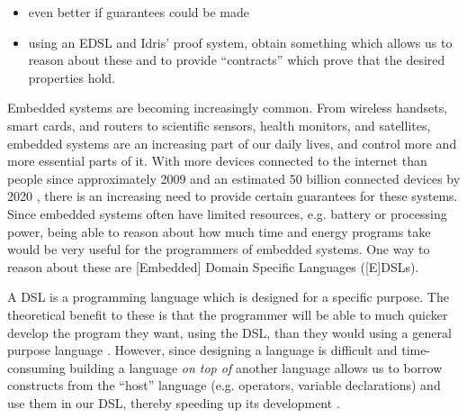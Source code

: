 \begin{itemize}
	\item even better if guarantees could be made
	\item using an EDSL and Idris' proof system, obtain something which allows
		  us to reason about these and to provide ``contracts'' which prove that
		  the desired properties hold.
\end{itemize}

Embedded systems are becoming increasingly common. From wireless handsets, smart cards, and routers to scientific sensors, health monitors, and satellites, embedded systems are an increasing part of our daily lives, and control more and more essential parts of it. With more devices connected to the internet than people since approximately 2009 and an estimated 50 billion connected devices by 2020 \cite{cisco-whitepaper}, there is an increasing need to provide certain guarantees for these systems. Since embedded systems often have limited resources, e.g. battery or processing power, being able to reason about how much time and energy programs take would be very useful for the programmers of embedded systems. One way to reason about these are [Embedded] Domain Specific Languages ([E]DSLs).\\\par

A DSL is a programming language which is designed for a specific purpose. The theoretical benefit to these is that the programmer will be able to much quicker develop the program they want, using the DSL, than they would using a general purpose language \cite{685738}. However, since designing a language is difficult and time-consuming building a language \textit{on top of} another language allows us to borrow constructs from the ``host'' language (e.g. operators, variable declarations) and use them in our DSL, thereby speeding up its development \cite{hudak1996building}.\\\par

